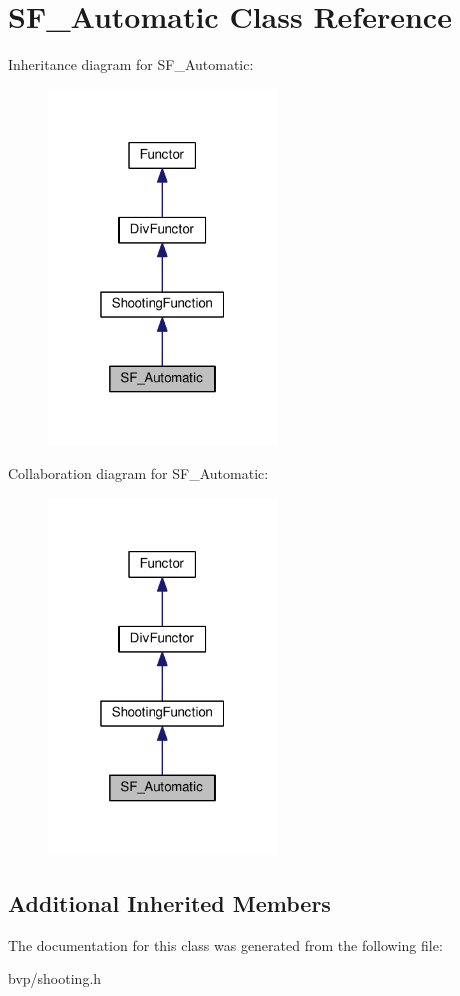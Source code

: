 \hypertarget{classSF__Automatic}{}\section{S\+F\+\_\+\+Automatic Class Reference}
\label{classSF__Automatic}


Inheritance diagram for S\+F\+\_\+\+Automatic\+:\nopagebreak
\begin{figure}[H]
\begin{center}
\leavevmode
\includegraphics[width=172pt]{classSF__Automatic__inherit__graph}
\end{center}
\end{figure}


Collaboration diagram for S\+F\+\_\+\+Automatic\+:\nopagebreak
\begin{figure}[H]
\begin{center}
\leavevmode
\includegraphics[width=172pt]{classSF__Automatic__coll__graph}
\end{center}
\end{figure}
\subsection*{Additional Inherited Members}


The documentation for this class was generated from the following file\+:\begin{DoxyCompactItemize}
\item 
bvp/shooting.\+h\end{DoxyCompactItemize}
